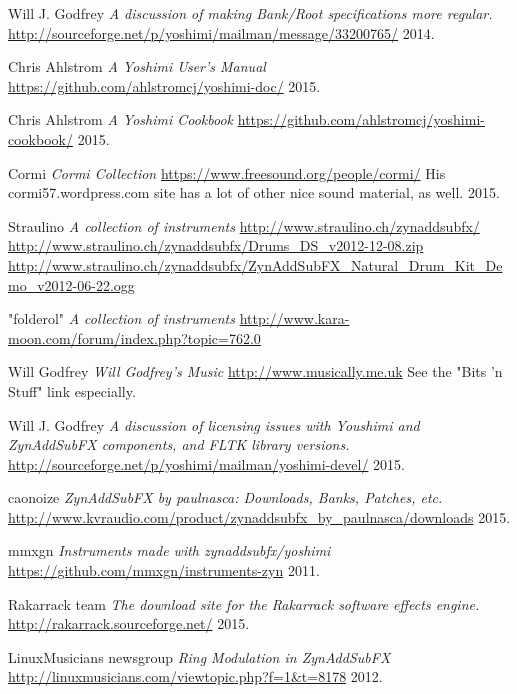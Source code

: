 \begin{thebibliography}{99}

   Will J. Godfrey
   \emph{A discussion of making Bank/Root specifications more regular.}
   \url{http://sourceforge.net/p/yoshimi/mailman/message/33200765/}
   2014.

   Chris Ahlstrom
   \emph{A Yoshimi User's Manual}
   \url{https://github.com/ahlstromcj/yoshimi-doc/}
   2015.

   Chris Ahlstrom
   \emph{A Yoshimi Cookbook}
   \url{https://github.com/ahlstromcj/yoshimi-cookbook/}
   2015.

   Cormi
   \emph{Cormi Collection}
   \url{https://www.freesound.org/people/cormi/}
   His cormi57.wordpress.com site has a lot of other nice sound material, as
   well.
   2015.

   Straulino
   \emph{A collection of instruments}
   \url{http://www.straulino.ch/zynaddsubfx/}
   \url{http://www.straulino.ch/zynaddsubfx/Drums\_DS\_v2012-12-08.zip}
   \url{http://www.straulino.ch/zynaddsubfx/ZynAddSubFX\_Natural\_Drum\_Kit\_Demo\_v2012-06-22.ogg}

   "folderol"
   \emph{A collection of instruments}
   \url{http://www.kara-moon.com/forum/index.php?topic=762.0}

   Will Godfrey
   \emph{Will Godfrey's Music}
   \url{http://www.musically.me.uk}
   See the "Bits 'n Stuff" link especially.

   Will J. Godfrey
   \emph{A discussion of licensing issues with Youshimi and ZynAddSubFX
   components, and FLTK library versions.}
   \url{http://sourceforge.net/p/yoshimi/mailman/yoshimi-devel/}
   2015.

   caonoize
   \emph{ZynAddSubFX by paulnasca: Downloads, Banks, Patches, etc.}
   \url{http://www.kvraudio.com/product/zynaddsubfx\_by\_paulnasca/downloads}
   2015.

   mmxgn
   \emph{Instruments made with zynaddsubfx/yoshimi}
   \url{https://github.com/mmxgn/instruments-zyn}
   2011.

   Rakarrack team
   \emph{The download site for the Rakarrack software effects engine.}
   \url{http://rakarrack.sourceforge.net/}
   2015.

   LinuxMusicians newsgroup
   \emph{Ring Modulation in ZynAddSubFX}
   \url{http://linuxmusicians.com/viewtopic.php?f=1&t=8178}
   2012.


\end{thebibliography}
